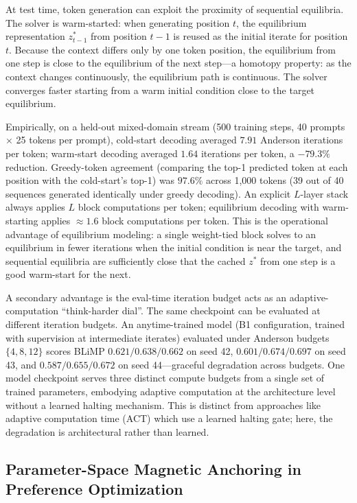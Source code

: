 At test time, token generation can exploit the proximity of sequential equilibria. The solver is warm-started: when generating position $t$, the equilibrium representation $z^*_{t-1}$ from position $t-1$ is reused as the initial iterate for position $t$. Because the context differs only by one token position, the equilibrium from one step is close to the equilibrium of the next step---a homotopy property: as the context changes continuously, the equilibrium path is continuous. The solver converges faster starting from a warm initial condition close to the target equilibrium.

Empirically, on a held-out mixed-domain stream (500 training steps, 40 prompts $\times$ 25 tokens per prompt), cold-start decoding averaged $7.91$ Anderson iterations per token; warm-start decoding averaged $1.64$ iterations per token, a $-79.3\%$ reduction. Greedy-token agreement (comparing the top-1 predicted token at each position with the cold-start's top-1) was $97.6\%$ across 1,000 tokens (39 out of 40 sequences generated identically under greedy decoding). An explicit $L$-layer stack always applies $L$ block computations per token; equilibrium decoding with warm-starting applies $\approx 1.6$ block computations per token. This is the operational advantage of equilibrium modeling: a single weight-tied block solves to an equilibrium in fewer iterations when the initial condition is near the target, and sequential equilibria are sufficiently close that the cached $z^*$ from one step is a good warm-start for the next.

A secondary advantage is the eval-time iteration budget acts as an adaptive-computation ``think-harder dial''. The same checkpoint can be evaluated at different iteration budgets. An anytime-trained model (B1 configuration, trained with supervision at intermediate iterates) evaluated under Anderson budgets $\{4, 8, 12\}$ scores BLiMP $0.621 / 0.638 / 0.662$ on seed 42, $0.601 / 0.674 / 0.697$ on seed 43, and $0.587 / 0.655 / 0.672$ on seed 44---graceful degradation across budgets. One model checkpoint serves three distinct compute budgets from a single set of trained parameters, embodying adaptive computation at the architecture level without a learned halting mechanism. This is distinct from approaches like adaptive computation time (ACT) which use a learned halting gate; here, the degradation is architectural rather than learned.

\subsection*{Parameter-Space Magnetic Anchoring in Preference Optimization}

